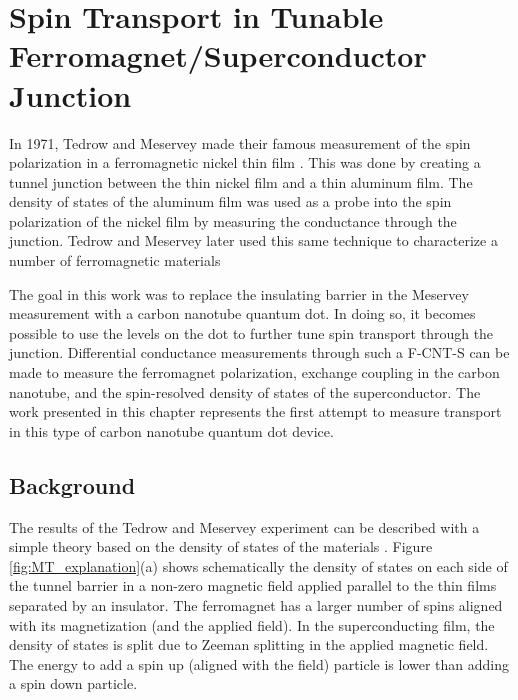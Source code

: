 \chapter{Spin Transport in Tunable Ferromagnet/Superconductor Junction}
\label{sec:SCFM}


In 1971, Tedrow and Meservey made their famous measurement of the spin polarization in a ferromagnetic nickel thin film \cite{Tedrow1971}. This was done by creating a tunnel junction between the thin nickel film and a thin aluminum film. The density of states of the aluminum film was used as a probe into the spin polarization of the nickel film by measuring the conductance through the junction. Tedrow and Meservey later used this same technique to characterize a number of ferromagnetic materials \cite{Tedrow1973}


The goal in this work was to replace the insulating barrier in the Meservey measurement with a carbon nanotube quantum dot. In doing so, it becomes possible to use the levels on the dot to further tune spin transport through the junction. Differential conductance measurements through such a F-CNT-S can be made to measure the ferromagnet polarization, exchange coupling in the carbon nanotube, and the spin-resolved density of states of the superconductor. The work presented in this chapter represents the first attempt to measure transport in this type of carbon nanotube quantum dot device.

\section{Background}

The results of the Tedrow and Meservey experiment can be described with a simple theory based on the density of states of the materials \cite{Meservey1994}. Figure \ref{fig:MT_explanation}(a) shows schematically the density of states on each side of the tunnel barrier in a non-zero magnetic field applied parallel to the thin films separated by an insulator. The ferromagnet has a larger number of spins aligned with its magnetization (and the applied field). In the superconducting film, the density of states is split due to Zeeman splitting in the applied magnetic field. The energy to add a spin up (aligned with the field) particle is lower than adding a spin down particle. 

